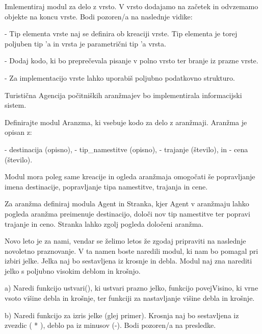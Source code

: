 \begin{ex}

Imlementiraj modul za delo z vrsto. V vrsto dodajamo na za\v cetek in
odvzemamo objekte na koncu vrste. Bodi pozoren/a na naslednje vidike:

- Tip elementa vrste naj se definira ob kreaciji vrste. Tip elementa
  je torej poljuben tip 'a in vrsta je parametri\v cni tip 'a vrsta.
  
- Dodaj kodo, ki bo prepre\v cevala pisanje v polno vrsto ter branje iz
  prazne vrste.
  
- Za implementacijo vrste lahko uporabi\v s poljubno podatkovno strukturo.

\end{ex}
\begin{ex}
Turisti\v cna Agencija po\v citni\v skih aran\v zmajev bo implementirala
informacijski sistem.

Definirajte modul Aranzma, ki vsebuje kodo za delo z
aran\v zmaji. Aran\v zma je opisan z:

- destinacija (opisno), 
- tip\_namestitve (opisno), 
- trajanje (\v stevilo), in 
- cena (\v stevilo).

Modul mora poleg same kreacije in ogleda aran\v zmaja omogo\v cati \v se
popravljanje imena destinacije, popravljanje tipa namestitve, trajanja
in cene.

Za aran\v zma definiraj modula Agent in Stranka, kjer Agent v aran\v zmaju
lahko pogleda aran\v zma preimenuje destinacijo, dolo\v ci nov tip
namestitve ter popravi trajanje in ceno. Stranka lahko zgolj pogleda
dolo\v ceni aran\v zma.



\end{ex}
\begin{ex}
Novo leto je za nami, vendar se \v zelimo letos \v ze zgodaj pripraviti na
naslednje novoletno praznovanje. V ta namen boste naredili modul, ki
nam bo pomagal pri izbiri jelke. Jelka naj bo sestavljena iz krosnje
in debla. Modul naj zna narediti jelko s poljubno visokim deblom in
kro\v snjo.

a) Naredi funkcijo ustvari(), ki ustvari prazno jelko, funkcijo
povejVisino, ki vrne vsoto vi\v sine debla in kro\v snje, ter funkciji za
nastavljanje vi\v sine debla in kro\v snje.

b) Naredi funkcijo za izris jelke (glej primer). Krosnja naj bo
sestavljena iz zvezdic ( * ), deblo pa iz minusov (-). Bodi pozoren/a
na presledke.



\end{ex}
